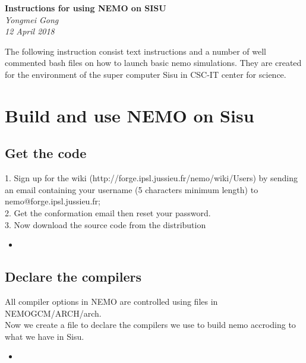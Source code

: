 \documentclass[11pt]{article}
\newcommand{\insertcode}[2]{\begin{itemize}\item[]\end{itemize}} %
\begin{document}
\begin{titlepage}
   \begin{center}
      \Large\textbf{Instructions for using NEMO on SISU}\\[4\baselineskip]
      \large\textit{Yongmei Gong}\\
      \large\textit{12 April 2018}
   \end{center}
\end{titlepage}

The following instruction consist text instructions and a number of well commented bash files on how to launch basic nemo simulations. They are created for the environment of the super computer Sisu in CSC-IT center for science.\\
\tableofcontents
\newpage
\section{Build and use NEMO on Sisu}
\subsection{Get the code}
1. Sign up for the wiki (http://forge.ipsl.jussieu.fr/nemo/wiki/Users) by sending an email containing your username (5 characters minimum length) to nemo@forge.ipsl.jussieu.fr;\\
2. Get the conformation email then reset your password.\\
3. Now download the source code from the distribution
\insertcode{"./get_nemo_code.bash"}{} %
\subsection{Declare the compilers}
All compiler options in NEMO are controlled using files in NEMOGCM/ARCH/arch.\\
Now we create a file to declare the compilers we use to build nemo accroding to what we have in Sisu.
\insertcode{"./creat_compiler_links.bash"}{} %
\end{document}
